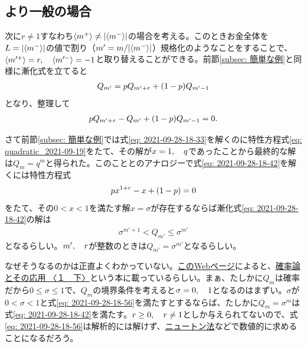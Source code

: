 \documentclass[twoside,openright,a4paper,papersize,uplatex,dvipdfmx]{jsarticle}
\newcommand{\rrr}{r} %
\begin{document}
  \subsection{より一般の場合}
  \label{subsec:より一般の場合}
  次に$\rrr \neq 1$すなわち$\expval{m^{+}} \neq \abs{\expval{m^{-}}}$の場合を考える。このときお金全体を$ L = \abs{ \expval{ m^{-} } }$の値で割り（$m ' = m / \abs{ \expval{ m^{-} } }$）規格化のようなことをすることで、$\expval{ m'^{+} } = \rrr \qc \expval{ m'^{-} } = -1$と取り替えることができる。前節\ref{subsec: 簡単な例}と同様に漸化式を立てると
  \begin{align*}
    Q_{m'} = p Q_{m' + \rrr} + \qty(1 - p) Q_{m'-1}
  \end{align*}
  となり、整理して
  \begin{align} \label{eq: 2021-09-28-18-42}
    p Q_{m' + \rrr} - Q_{m'} + \qty(1 - p) Q_{m'-1} = 0.
  \end{align}

  さて前節\ref{subsec: 簡単な例}では式\eqref{eq: 2021-09-28-18-33}を解くのに特性方程式\eqref{eq: quadratic_2021-09-19}をたて、その解が$x = 1 \qc q$であったことから最終的な解は$Q_{m} = q^{m}$と得られた。このこととのアナロジーで式\eqref{eq: 2021-09-28-18-42}を解くには特性方程式
  \begin{align} \label{eq: 2021-09-28-18-56}
    p x^{1 + \rrr} - x + \qty(1-p) = 0
  \end{align}
  をたて、その$0 < x < 1$を満たす解$x = \sigma$が存在するならば漸化式\eqref{eq: 2021-09-28-18-42}の解は
  \begin{align} \label{eq: 2021-09-28-20-26}
    \sigma^{m' + 1} < Q_{m'} \le  \sigma^{m'}
  \end{align}
  となるらしい。$m' \qc r$が整数のときは$Q_{m'} = \sigma^{m'}$となるらしい。

  なぜそうなるのかは正直よくわかっていない。\href{http://geolog.mydns.jp/www.geocities.jp/y_infty/management/bankruptcy.html}{このWebページ}によると、\href{https://www.kinokuniya.co.jp/f/dsg-01-9784314000161}{確率論とその応用 〈１　下〉}という本に載っているらしい。まぁ、たしかに$Q_{m}$は確率だから$0 \le \sigma \le 1$で、$Q_{m}$の境界条件を考えると$\sigma = 0 \qc 1$となるのはまずい。$\sigma$が$0 < \sigma < 1$と式\eqref{eq: 2021-09-28-18-56}を満たすとするならば、たしかに$Q_{m} = \sigma^{m}$は式\eqref{eq: 2021-09-28-18-42}を満たす。$\rrr \ge 0 \qc \rrr \neq 1$としか与えられてないので、式\eqref{eq: 2021-09-28-18-56}は解析的には解けず、\href{https://ja.wikipedia.org/wiki/%E3%83%8B%E3%83%A5%E3%83%BC%E3%83%88%E3%83%B3%E6%B3%95}{ニュートン法}などで数値的に求めることになるだろう。
\end{document}
